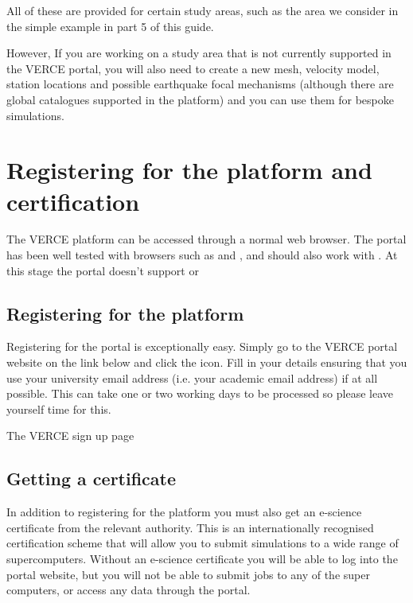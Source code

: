 \documentclass[english]{book}
\begin{document}
All of these are provided for certain study areas, such as the area we
consider in the simple example in part 5 of this guide.

However, If you are working on a study area that is not currently
supported in the VERCE portal, you will also need to create a new mesh,
velocity model, station locations and possible earthquake focal
mechanisms (although there are global catalogues supported in the
platform) and you can use them for bespoke simulations.



\chapter{Registering for the platform and certification}
\label{\detokenize{Section3:registering-for-the-platform-and-certification}}\label{\detokenize{Section3::doc}}
The VERCE platform can be accessed through a normal web browser. The
portal has been well tested with browsers such as  and
, and should also work with . At this stage the
portal doesn’t support  or 


\section{Registering for the platform}
\label{\detokenize{Section3:registering-for-the-platform}}
Registering for the portal is exceptionally easy. Simply go to the VERCE
portal website on the link below and click the icon. Fill in
your details ensuring that you use your university email address (i.e.
your academic email address) if at all possible. This can take one or
two working days to be processed so please leave yourself time for this.



 The VERCE sign up page


\section{Getting a certificate}
\label{\detokenize{Section3:getting-a-certificate}}
In addition to registering for the platform you must also get an
e-science certificate from the relevant authority. This is an
internationally recognised certification scheme that will allow you to
submit simulations to a wide range of supercomputers. Without an
e-science certificate you will be able to log into the portal website,
but you will not be able to submit jobs to any of the super computers,
or access any data through the portal.
\end{document}
